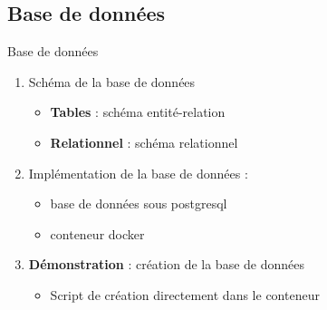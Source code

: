 \documentclass[numbering=fraction]{beamer}
\begin{document}
\subsection{Base de données}
\begin{frame}{Base de données}
    \begin{enumerate}
        \item Schéma de la base de données
        \begin{itemize}
            \item \textbf{Tables} : schéma entité-relation
            \item \textbf{Relationnel} : schéma relationnel
        \end{itemize}
        \item Implémentation de la base de données : 
        \begin{itemize}
            \item base de données sous postgresql
            \item conteneur docker
        \end{itemize}
        \item \textbf{Démonstration} : création de la base de données
        \begin{itemize}
            \item Script de création directement dans le conteneur
        \end{itemize}
    \end{enumerate}
    
\end{frame}
\end{document}
